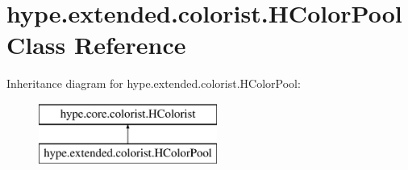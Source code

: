 \hypertarget{classhype_1_1extended_1_1colorist_1_1_h_color_pool}{\section{hype.\-extended.\-colorist.\-H\-Color\-Pool Class Reference}
\label{classhype_1_1extended_1_1colorist_1_1_h_color_pool}
}
Inheritance diagram for hype.\-extended.\-colorist.\-H\-Color\-Pool\-:\begin{figure}[H]
\begin{center}
\leavevmode
\includegraphics[height=2.000000cm]{classhype_1_1extended_1_1colorist_1_1_h_color_pool}
\end{center}
\end{figure}
